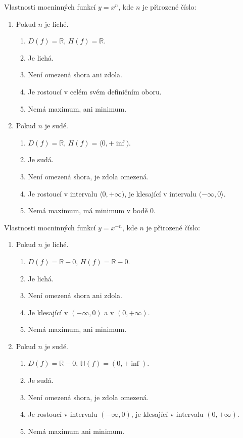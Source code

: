 \begin{veta}
  Vlastnosti mocninných funkcí $y= x^n$, kde $n$ je přirozené číslo:
  \begin{enumerate}[1.]
    \item Pokud $n$ je liché.
    \begin{enumerate}[$i.$]
      \item $D(f)= \mathbb R$, $H(f)= \mathbb R$.
      \item Je lichá.
      \item Není omezená shora ani zdola.
      \item Je rostoucí v celém svém definičním oboru.
      \item Nemá maximum, ani minimum.
    \end{enumerate}
    \item Pokud $n$ je sudé.
    \begin{enumerate}[$i.$]
      \item $D(f)= \mathbb R$, $H(f)= \langle 0,+\inf )$.
      \item Je sudá.
      \item Není omezená shora, je zdola omezená.
      \item Je rostoucí v intervalu $\langle 0,+\infty )$, je klesající v intervalu $( -\infty,0 \rangle $.
      \item Nemá maximum, má minimum v bodě $0$.
    \end{enumerate}
  \end{enumerate}
\end{veta}

\begin{veta}
  Vlastnosti mocninných funkcí $y= x^{-n}$, kde $n$ je přirozené číslo:
  \begin{enumerate}[1.]
    \item Pokud $n$ je liché.
    \begin{enumerate}[$i.$]
      \item $D(f)= \mathbb R - {0}$, $H(f)= \mathbb R - {0}$.
      \item Je lichá.
      \item Není omezená shora ani zdola.
      \item Je klesající v $( -\infty,0)$ a v $( 0,+\infty )$.
      \item Nemá maximum, ani minimum.
    \end{enumerate}
    \item Pokud $n$ je sudé.
    \begin{enumerate}[$i.$]
      \item $D(f)= \mathbb R - {0}$, $\mathbb H(f)= ( 0,+\inf )$.
      \item Je sudá.
      \item Není omezená shora, je zdola omezená.
      \item Je rostoucí v intervalu $( -\infty,0 ) $, je klesající v intervalu $( 0,+\infty )$.
      \item Nemá maximum ani minimum.
    \end{enumerate}
  \end{enumerate}
\end{veta}

